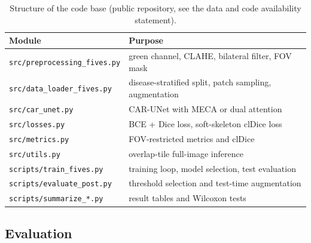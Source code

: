 \documentclass[a4paper,fleqn]{cas-sc}
\begin{document}
\begin{table}[t]
\caption{Structure of the code base (public repository, see the data and code availability statement).}
\label{tab:code}
\centering
\small
\begin{tabular}{ll}
\toprule
Module & Purpose \\
\midrule
\texttt{src/preprocessing\_fives.py} & green channel, CLAHE, bilateral filter, FOV mask \\
\texttt{src/data\_loader\_fives.py} & disease-stratified split, patch sampling, augmentation \\
\texttt{src/car\_unet.py} & CAR-UNet with MECA or dual attention \\
\texttt{src/losses.py} & BCE + Dice loss, soft-skeleton clDice loss \\
\texttt{src/metrics.py} & FOV-restricted metrics and clDice \\
\texttt{src/utils.py} & overlap-tile full-image inference \\
\texttt{scripts/train\_fives.py} & training loop, model selection, test evaluation \\
\texttt{scripts/evaluate\_post.py} & threshold selection and test-time augmentation \\
\texttt{scripts/summarize\_*.py} & result tables and Wilcoxon tests \\
\bottomrule
\end{tabular}
\end{table}

\subsection{Evaluation}
\end{document}
